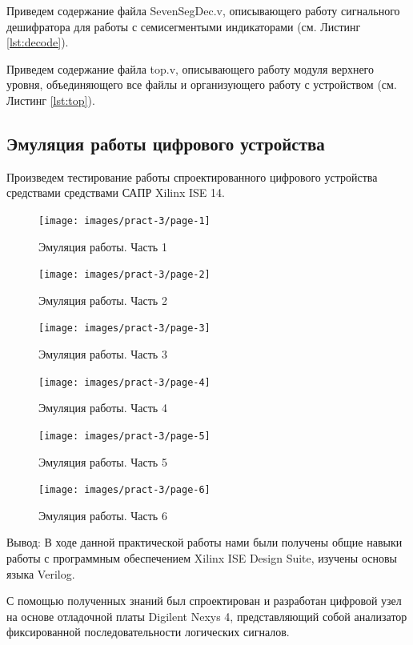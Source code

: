 \documentclass[a4paper,14pt]{extarticle}
\begin{document}



Приведем содержание файла SevenSegDec.v, описывающего работу сигнального дешифратора для работы с семисегментыми индикаторами  (см. Листинг \ref{lst:decode}).




Приведем содержание файла top.v, описывающего работу модуля верхнего уровня, объединяющего все файлы и организующего работу с устройством  (см. Листинг \ref{lst:top}).



\subsection*{Эмуляция работы цифрового устройства}

Произведем тестирование работы спроектированного цифрового устройства средствами средствами САПР Xilinx ISE 14. 

\begin{figure}[htpb]
	\centering
	\texttt{[image: images/pract-3/page-1]}
	\caption{Эмуляция работы. Часть 1}
	\label{fig:page-1}
\end{figure}
\begin{figure}[htpb]
	\centering
	\texttt{[image: images/pract-3/page-2]}
	\caption{Эмуляция работы. Часть 2}
	\label{fig:page-2}
\end{figure}
\begin{figure}[htpb]
	\centering
	\texttt{[image: images/pract-3/page-3]}
	\caption{Эмуляция работы. Часть 3}
	\label{fig:page-3}
\end{figure}
\begin{figure}[htpb]
	\centering
	\texttt{[image: images/pract-3/page-4]}
	\caption{Эмуляция работы. Часть 4}
	\label{fig:page-4}
\end{figure}
\begin{figure}[htpb]
	\centering
	\texttt{[image: images/pract-3/page-5]}
	\caption{Эмуляция работы. Часть 5}
	\label{fig:page-5}
\end{figure}
\begin{figure}[htpb]
	\centering
	\texttt{[image: images/pract-3/page-6]}
	\caption{Эмуляция работы. Часть 6}
	\label{fig:page-6}
\end{figure}

 
\clearpage
{Вывод: }
В ходе данной практической работы нами были получены общие навыки работы с программным обеспечением Xilinx ISE Design Suite, изучены основы языка Verilog.

С помощью полученных знаний был спроектирован и разработан цифровой узел на основе отладочной платы Digilent Nexys 4, представляющий собой анализатор фиксированной последовательности логических
сигналов. 
\end{document}
